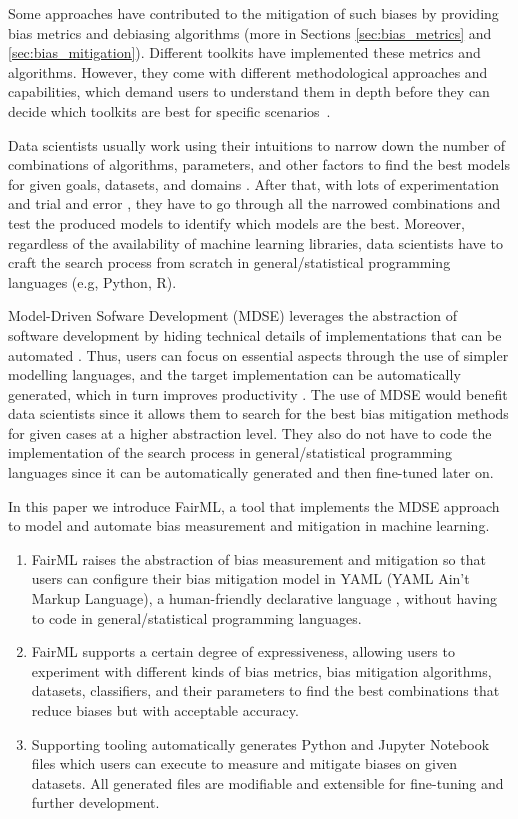 \documentclass[sigconf,review]{acmart}
\begin{document}
	Some approaches have contributed to the mitigation of such biases by providing bias metrics and debiasing algorithms (more in Sections \ref{sec:bias_metrics} and \ref{sec:bias_mitigation}). 
	Different toolkits have implemented these metrics and algorithms.
	However, they come with different methodological approaches and capabilities, which demand users to understand them in depth before they can decide which toolkits are best for specific scenarios~\cite{lee2021landscape}.  
	
	Data scientists usually work using their intuitions to narrow down the number of combinations of algorithms, parameters, and other factors to find the best models for given goals, datasets, and domains \cite{muller2016introduction}. After that, with lots of experimentation and trial and error \cite{byrne2017development}, they have to go through all the narrowed combinations and test the produced models to identify which models are the best. Moreover, regardless of the availability of machine learning libraries, data scientists have to craft the search process from scratch in general/statistical programming languages (e.g, Python, R).
	
	Model-Driven Sofware Development (MDSE) leverages the abstraction of software development by hiding technical details of implementations that can be automated \cite{brambilla2017model}. Thus, users can focus on essential aspects through the use of simpler modelling languages, and the target implementation can be automatically generated, which in turn improves productivity \cite{volter2013model}. The use of MDSE would benefit data scientists since it allows them to search for the best bias mitigation methods for given cases at a higher abstraction level. They also do not have to code the implementation of the search process in general/statistical programming languages since it can be automatically generated and then fine-tuned later on. 
	
	In this paper we introduce FairML, a tool that implements the MDSE approach to model and automate bias measurement and mitigation in machine learning. 
	\begin{enumerate}
		\item FairML raises the abstraction of bias measurement and mitigation so that users can configure their bias mitigation model in YAML (YAML Ain't Markup Language), a human-friendly declarative language \cite{evans2017yaml}, without having to code in general/statistical programming languages.
		\item FairML supports a certain degree of expressiveness, allowing users to experiment with different kinds of bias metrics, bias mitigation algorithms, datasets, classifiers, and their parameters to find the best combinations that reduce biases but with acceptable accuracy.
		\item Supporting tooling automatically generates Python and Jupyter Notebook files which users can execute to measure and mitigate biases on given datasets. All generated files are modifiable and extensible for fine-tuning and further development.
	\end{enumerate}
	
\end{document}
